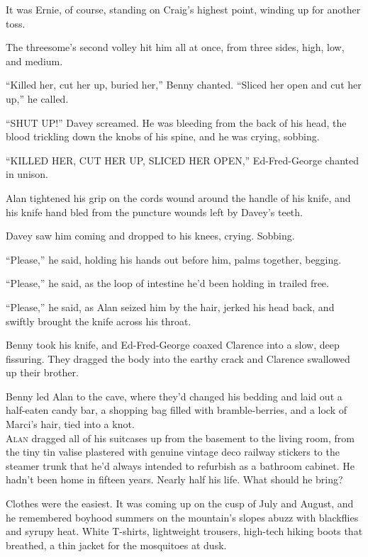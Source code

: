 \documentclass{article}
\begin{document}
It was Ernie, of course, standing on Craig's highest point, winding up
for another toss.

The threesome's second volley hit him all at once, from three sides,
high, low, and medium.

``Killed her, cut her up, buried her,'' Benny chanted.  ``Sliced her
open and cut her up,'' he called.

``SHUT UP!'' Davey screamed.  He was bleeding from the back of his
head, the blood trickling down the knobs of his spine, and he was
crying, sobbing.

``KILLED HER, CUT HER UP, SLICED HER OPEN,'' Ed-Fred-George chanted in
unison.

Alan tightened his grip on the cords wound around the handle of his
knife, and his knife hand bled from the puncture wounds left by
Davey's teeth.

Davey saw him coming and dropped to his knees, crying.  Sobbing.

``Please,'' he said, holding his hands out before him, palms together,
begging.

``Please,'' he said, as the loop of intestine he'd been holding in
trailed free.

``Please,'' he said, as Alan seized him by the hair, jerked his head
back, and swiftly brought the knife across his throat.

Benny took his knife, and Ed-Fred-George coaxed Clarence into a slow,
deep fissuring.  They dragged the body into the earthy crack and
Clarence swallowed up their brother.

Benny led Alan to the cave, where they'd changed his bedding and laid
out a half-eaten candy bar, a shopping bag filled with
bramble-berries, and a lock of Marci's hair, tied into a knot.
\\
\lettrine[lines=3, lhang=.5, nindent=0pt, findent=2pt]{A}{lan} dragged all of his suitcases up from the basement to the living
room, from the tiny tin valise plastered with genuine vintage deco
railway stickers to the steamer trunk that he'd always intended to
refurbish as a bathroom cabinet.  He hadn't been home in fifteen
years.  Nearly half his life.  What should he bring?

Clothes were the easiest.  It was coming up on the cusp of July and
August, and he remembered boyhood summers on the mountain's slopes
abuzz with blackflies and syrupy heat.  White T-shirts, lightweight
trousers, high-tech hiking boots that breathed, a thin jacket for the
mosquitoes at dusk.
\end{document}
